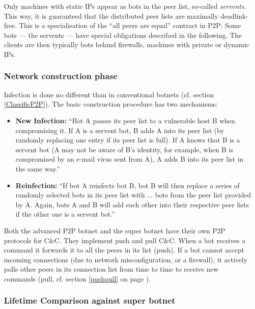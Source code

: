 \documentclass{llncs}
\begin{document}
Only machines with static IPs appear as bots in the peer list,
so-called {\it servents}. \cite{td1sc} This way, it is guaranteed that
the distributed peer lists are maximally deadlink-free.  This is a
specialisation of the ``all peers are equal'' contract in P2P: Some
bots --- the servents --- have special obligations described in the
following.  The clients are then typically bots behind firewalls,
machines with private or dynamic IPs.

\subsubsection{Network construction phase}

Infection is done no different than in conventional botnets
(cf. section \ref{ClassificP2P}). The basic construction procedure has two
mechanisms:
\begin{itemize}
\item {\bf New Infection:} ``Bot A passes its peer list to a
vulnerable host B when compromising it. If A is a
servent bot, B adds A into its peer list (by randomly
replacing one entry if its peer list is full). If A knows
that B is a servent bot (A may not be aware of
B’s identity, for example, when B is compromised by
an e-mail virus sent from A), A adds B into its peer
list in the same way.'' \cite{td1sc}
\item {\bf Reinfection:} ``If bot A
reinfects bot B, bot B will then replace \lbrack{}a series of\rbrack{} 
 randomly selected bots in its peer list with \lbrack{}...\rbrack{} bots
from the peer list provided by A. Again, bots A and B
will add each other into their respective peer lists if
the other one is a servent bot.''\cite{td1sc}
\end{itemize}

Both the advanced P2P botnet and the super botnet have their own P2P
protocols for C\&C. They implement push and pull
C\&C.\cite{wang2009systematic} When a bot receives a command it
forwards it to all the peers in its list (push). If a bot cannot
accept incoming connections (due to network misconfiguration, or a
firewall), it actively polls other peers in its connection list from
time to time to receive new commands (pull, cf. section \ref{pushpull}
on page \pageref{pushpull}).

\subsubsection{Lifetime Comparison against super botnet}
\end{document}
